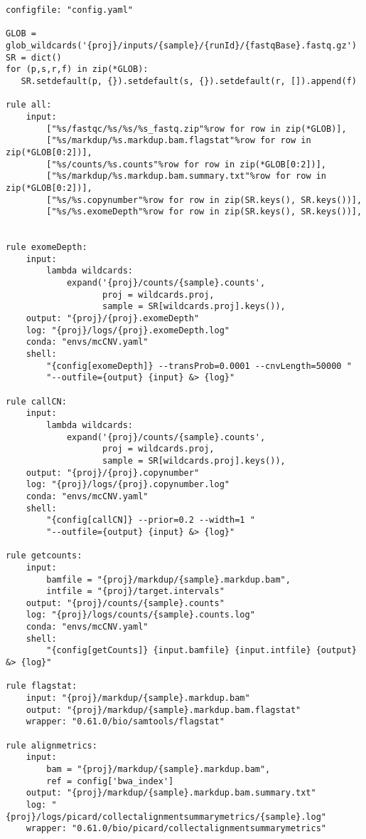 \documentclass{article}\usepackage[]{graphicx}\usepackage[]{color}
\makeatletter
\newenvironment{kframe}{%
 \def\at@end@of@kframe{}%
 \ifinner\ifhmode%
  \def\at@end@of@kframe{\end{minipage}}%
  \begin{minipage}{\columnwidth}%
 \fi\fi%
 \def\FrameCommand##1{\hskip\@totalleftmargin \hskip-\fboxsep
 \colorbox{shadecolor}{##1}\hskip-\fboxsep
     \hskip-\linewidth \hskip-\@totalleftmargin \hskip\columnwidth}%
 \MakeFramed {\advance\hsize-\width
   \@totalleftmargin\z@ \linewidth\hsize
   \@setminipage}}%
 {\par\unskip\endMakeFramed%
 \at@end@of@kframe}
\newenvironment{knitrout}{}{} %
\makeatother
\begin{document}
\begin{knitrout}
\color{fgcolor}\begin{kframe}
\begin{verbatim}
configfile: "config.yaml"

GLOB = glob_wildcards('{proj}/inputs/{sample}/{runId}/{fastqBase}.fastq.gz')
SR = dict()
for (p,s,r,f) in zip(*GLOB):
   SR.setdefault(p, {}).setdefault(s, {}).setdefault(r, []).append(f)

rule all:
    input:
        ["%s/fastqc/%s/%s/%s_fastq.zip"%row for row in zip(*GLOB)], 
        ["%s/markdup/%s.markdup.bam.flagstat"%row for row in zip(*GLOB[0:2])],
        ["%s/counts/%s.counts"%row for row in zip(*GLOB[0:2])], 
        ["%s/markdup/%s.markdup.bam.summary.txt"%row for row in zip(*GLOB[0:2])],
        ["%s/%s.copynumber"%row for row in zip(SR.keys(), SR.keys())],
        ["%s/%s.exomeDepth"%row for row in zip(SR.keys(), SR.keys())],


rule exomeDepth:
    input:
        lambda wildcards: 
            expand('{proj}/counts/{sample}.counts', 
                   proj = wildcards.proj, 
                   sample = SR[wildcards.proj].keys()),
    output: "{proj}/{proj}.exomeDepth"
    log: "{proj}/logs/{proj}.exomeDepth.log"
    conda: "envs/mcCNV.yaml"
    shell:
        "{config[exomeDepth]} --transProb=0.0001 --cnvLength=50000 "
        "--outfile={output} {input} &> {log}"

rule callCN:
    input:
        lambda wildcards: 
            expand('{proj}/counts/{sample}.counts', 
                   proj = wildcards.proj, 
                   sample = SR[wildcards.proj].keys()),
    output: "{proj}/{proj}.copynumber"
    log: "{proj}/logs/{proj}.copynumber.log"
    conda: "envs/mcCNV.yaml"
    shell:
        "{config[callCN]} --prior=0.2 --width=1 "
        "--outfile={output} {input} &> {log}"

rule getcounts:
    input:
        bamfile = "{proj}/markdup/{sample}.markdup.bam",
        intfile = "{proj}/target.intervals"
    output: "{proj}/counts/{sample}.counts"
    log: "{proj}/logs/counts/{sample}.counts.log"
    conda: "envs/mcCNV.yaml"
    shell:
        "{config[getCounts]} {input.bamfile} {input.intfile} {output} &> {log}"

rule flagstat:
    input: "{proj}/markdup/{sample}.markdup.bam"
    output: "{proj}/markdup/{sample}.markdup.bam.flagstat"
    wrapper: "0.61.0/bio/samtools/flagstat"

rule alignmetrics:
    input: 
        bam = "{proj}/markdup/{sample}.markdup.bam",
        ref = config['bwa_index']
    output: "{proj}/markdup/{sample}.markdup.bam.summary.txt"
    log: "{proj}/logs/picard/collectalignmentsummarymetrics/{sample}.log"
    wrapper: "0.61.0/bio/picard/collectalignmentsummarymetrics"


\end{verbatim}
\end{kframe}
\end{knitrout}
\end{document}

